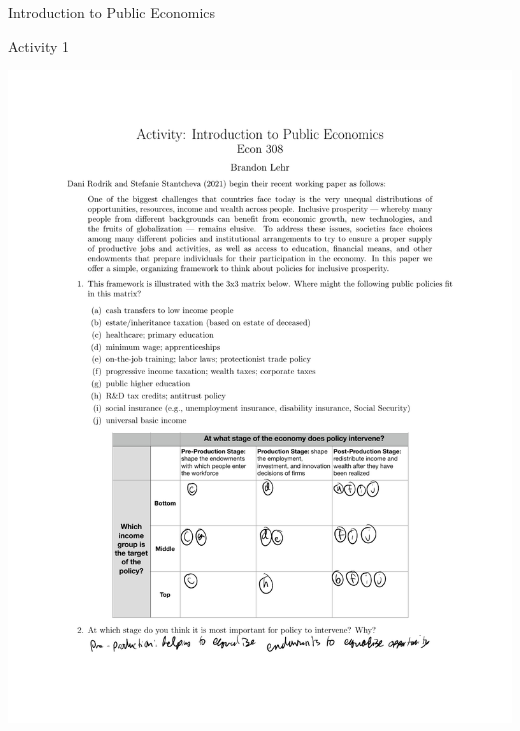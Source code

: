 \documentclass[8pt]{extarticle}
\begin{document}
\begin{problem}{Introduction to Public Economics}
\begin{problem}{Activity 1}
\begin{center}
        \includegraphics[width=\textwidth]{Activity_1.pdf}
      \end{center}
    \end{problem}
  \end{problem}
\end{document}
